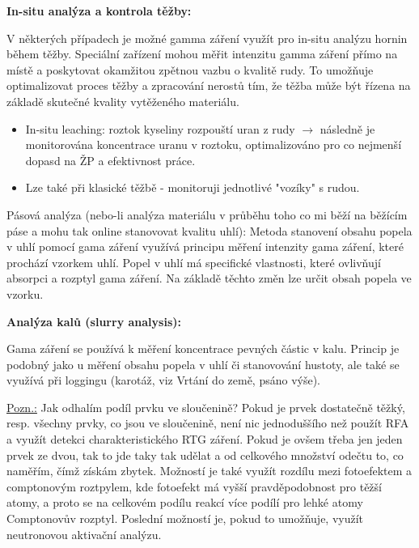 \textbf{In-situ analýza a kontrola těžby:}

V některých případech je možné gamma záření využít pro in-situ analýzu hornin během těžby. Speciální zařízení mohou měřit intenzitu gamma záření přímo na místě a poskytovat okamžitou zpětnou vazbu o kvalitě rudy. To umožňuje optimalizovat proces těžby a zpracování nerostů tím, že těžba může být řízena na základě skutečné kvality vytěženého materiálu.

\begin{itemize}
    \item In-situ leaching: roztok kyseliny rozpouští uran z rudy $\rightarrow$ následně je monitorována koncentrace uranu v roztoku, optimalizováno pro co nejmenší dopasd na ŽP a efektivnost práce.
    \item Lze také při klasické těžbě - monitoruji jednotlivé "vozíky" s rudou.
\end{itemize}


Pásová analýza (nebo-li analýza materiálu v průběhu toho co mi běží na běžícím páse a mohu tak online stanovovat kvalitu uhlí): Metoda stanovení obsahu popela v uhlí pomocí gama záření využívá principu měření intenzity gama záření, které prochází vzorkem uhlí. Popel v uhlí má specifické vlastnosti, které ovlivňují absorpci a rozptyl gama záření. Na základě těchto změn lze určit obsah popela ve vzorku.

\textbf{Analýza kalů (slurry analysis):} 

Gama záření se používá k měření koncentrace pevných částic v kalu. Princip je podobný jako u měření obsahu popela v uhlí či stanovování hustoty, ale také se využívá při loggingu (karotáž, viz Vrtání do země, psáno výše).

\underline{Pozn.:} Jak odhalím podíl prvku ve sloučenině? Pokud je prvek dostatečně těžký, resp. všechny prvky, co jsou ve sloučenině, není nic jednoduššího než použít RFA a využít detekci charakteristického RTG záření. Pokud je ovšem třeba jen jeden prvek ze dvou, tak to jde taky tak udělat a od celkového množství odečtu to, co naměřím, čímž získám zbytek. Možností je také využít rozdílu mezi fotoefektem a comptonovým roztpylem, kde fotoefekt má vyšší pravděpodobnost pro těžší atomy, a proto se na celkovém podílu reakcí více podílí pro lehké atomy Comptonovův rozptyl. Poslední možností je, pokud to umožňuje, využít neutronovou aktivační analýzu.

\newpage
\mbox{}
\newpage
